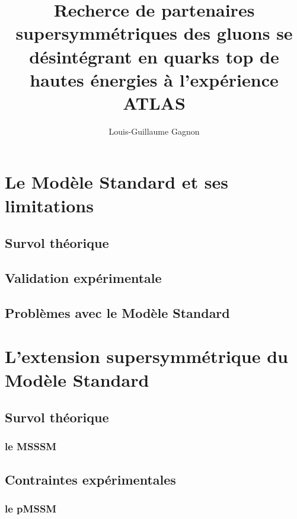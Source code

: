 \documentclass[12pt,canadien]{report}
\title{Recherce de partenaires supersymmétriques des gluons se
  désintégrant en quarks top de hautes énergies à l'expérience ATLAS}
\author{Louis-Guillaume Gagnon}
\begin{document}
\maketitle{}
\tableofcontents{}
\doublespacing

\chapter{Le Modèle Standard et ses limitations}
\label{sec:ms}

\section{Survol théorique}
\label{sec:ms:th}

\section{Validation expérimentale}
\label{sec:ms:exp}

\section{Problèmes avec le Modèle Standard}
\label{sec:ms:problemes}

\singlespacing{}
\chapter{L'extension supersymmétrique du Modèle Standard}
\label{sec:susy}
\doublespacing{}

\section{Survol théorique}
\label{sec:susy:th}

\subsection{le MSSSM}
\label{sec:susy:th:mssm}

\section{Contraintes expérimentales}
\label{sec:susy:contraintes}

\subsection{le pMSSM}
\label{sec:susy:contraintes:pmssm}
\end{document}

